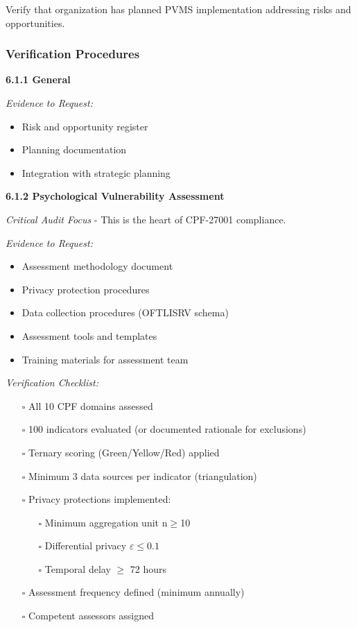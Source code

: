 \documentclass[11pt,a4paper]{article}
\begin{document}
Verify that organization has planned PVMS implementation addressing risks and opportunities.

\subsubsection{Verification Procedures}

\textbf{6.1.1 General}

\textit{Evidence to Request:}
\begin{itemize}
\item Risk and opportunity register
\item Planning documentation
\item Integration with strategic planning
\end{itemize}

\textbf{6.1.2 Psychological Vulnerability Assessment}

\textit{Critical Audit Focus} - This is the heart of CPF-27001 compliance.

\textit{Evidence to Request:}
\begin{itemize}
\item Assessment methodology document
\item Privacy protection procedures
\item Data collection procedures (OFTLISRV schema)
\item Assessment tools and templates
\item Training materials for assessment team
\end{itemize}

\textit{Verification Checklist:}
\begin{itemize}
\item[$\square$] All 10 CPF domains assessed
\item[$\square$] 100 indicators evaluated (or documented rationale for exclusions)
\item[$\square$] Ternary scoring (Green/Yellow/Red) applied
\item[$\square$] Minimum 3 data sources per indicator (triangulation)
\item[$\square$] Privacy protections implemented:
  \begin{itemize}
  \item[$\square$] Minimum aggregation unit n$\geq$10
  \item[$\square$] Differential privacy $\varepsilon \leq 0.1$
  \item[$\square$] Temporal delay $\geq$ 72 hours
  \end{itemize}
\item[$\square$] Assessment frequency defined (minimum annually)
\item[$\square$] Competent assessors assigned
\end{itemize}
\end{document}
